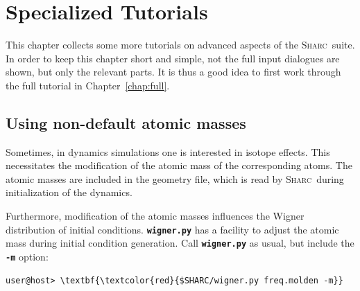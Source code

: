 \documentclass[a4paper,11pt,DIV=15,openany]{scrbook}
\newcommand{\sharc}{\textsc{Sharc}}
\newcommand{\ttt}[1]{\textbf{\texttt{#1}}}
\begin{document}

\chapter{Specialized Tutorials}

This chapter collects some more tutorials on advanced aspects of the \sharc\ suite.
In order to keep this chapter short and simple, not the full input dialogues are shown, but only the relevant parts.
It is thus a good idea to first work through the full tutorial in Chapter~\ref{chap:full}.

\section{Using non-default atomic masses}

Sometimes, in dynamics simulations one is interested in isotope effects. This necessitates the modification of the atomic mass of the corresponding atoms. The atomic masses are included in the geometry file, which is read by \sharc\ during initialization of the dynamics.

Furthermore, modification of the atomic masses influences the Wigner distribution of initial conditions. \ttt{wigner.py} has a facility to adjust the atomic mass during initial condition generation. Call \ttt{wigner.py} as usual, but include the \ttt{-m} option:
\begin{Verbatim}[commandchars=\\\{\}]
user@host> \textbf{\textcolor{red}{$SHARC/wigner.py freq.molden -m}}
\end{Verbatim}
\end{document}
